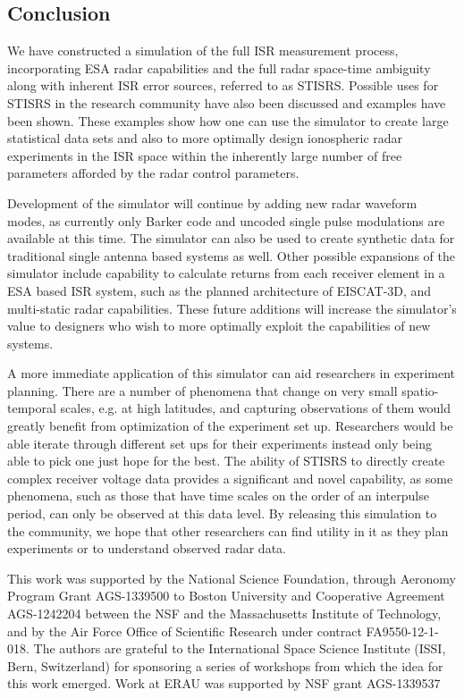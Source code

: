 \documentclass[draft,ras]{agutex}
\begin{document}
\begin{article}
\section{Conclusion}
We have constructed a simulation of the full ISR measurement process, incorporating ESA radar capabilities and the full radar space-time ambiguity along with inherent ISR error sources, referred to as STISRS. Possible uses for STISRS in the research community have also been discussed and examples have been shown. These examples show how one can use the simulator to create large statistical data sets and also to more optimally design ionospheric radar experiments in the ISR space within the inherently large number of free parameters afforded by the radar control parameters. 

Development of the simulator will continue by adding new radar waveform modes, as currently only Barker code and uncoded single pulse modulations are available at this time. The simulator can also be used to create synthetic data for traditional single antenna based systems as well. Other possible expansions of the simulator include capability to calculate returns from each receiver element in a ESA based ISR system, such as the planned architecture of EISCAT-3D, and multi-static radar capabilities. These future additions will increase the simulator's value to designers who wish to more optimally exploit the capabilities of new systems. 

A more immediate application of this simulator can aid researchers in experiment planning. There are a number of phenomena that change on very small spatio-temporal scales, e.g. at high latitudes, and capturing observations of them would greatly benefit from optimization of the experiment set up. Researchers would be able iterate through different set ups for their experiments instead only being able to pick one just hope for the best. The ability of STISRS to directly create complex receiver voltage data provides a significant and novel capability, as some phenomena, such as those that have time scales on the order of an interpulse period, can only be observed at this data level. By releasing this simulation to the community, we hope that other researchers can find utility in it as they plan experiments or to understand observed radar data. 

\begin{acknowledgments}
This work was supported by the National Science Foundation, through Aeronomy Program Grant AGS-1339500 to Boston University and Cooperative Agreement AGS-1242204 between the NSF and the Massachusetts Institute of Technology, and by the Air Force Office of Scientific Research under contract FA9550-12-1-018.   The authors are grateful to the International Space Science Institute (ISSI, Bern, Switzerland) for sponsoring a series of workshops from which the idea for this work emerged. Work at ERAU was supported by NSF grant AGS-1339537


\end{acknowledgments}
\end{article}
\end{document}
